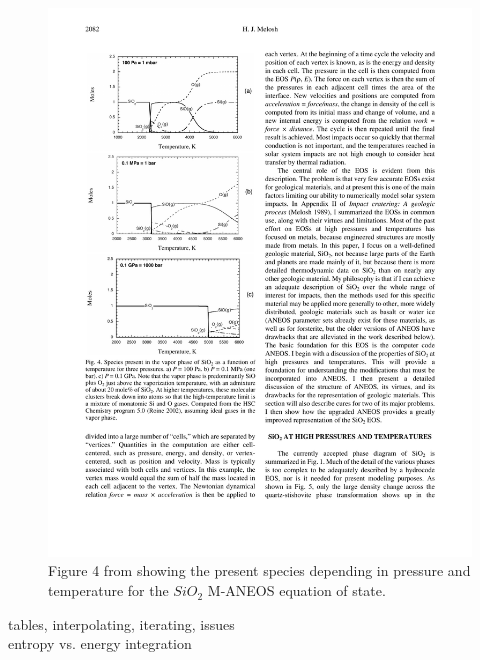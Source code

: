 \begin{figure}
\includegraphics[scale=1.0]{05aneos_phases03}
\caption{Figure 4 from \citep{Melosh:2007p3502} showing the present species depending in pressure and temperature for the $SiO_2$ M-ANEOS equation of state.}
\label{ch02_eos02_fig05}
\end{figure}




tables, interpolating, iterating, issues\\
entropy vs. energy integration\\

\citep{Melosh:2007p3502}
\citep{Thompson:1990p1103}

\citep{Abel:2010p3297}
\citep{Barnes:1986p2853}
\citep{Monaghan:2005p2677}
\citep{Ott:2003p3727}
\citep{Price:2004p2613}
\citep{Solenthaler:2008p3720}
\citep{Springel:2003p3298}
\citep{Monaghan:1992ARAA..30..543M}

% 

